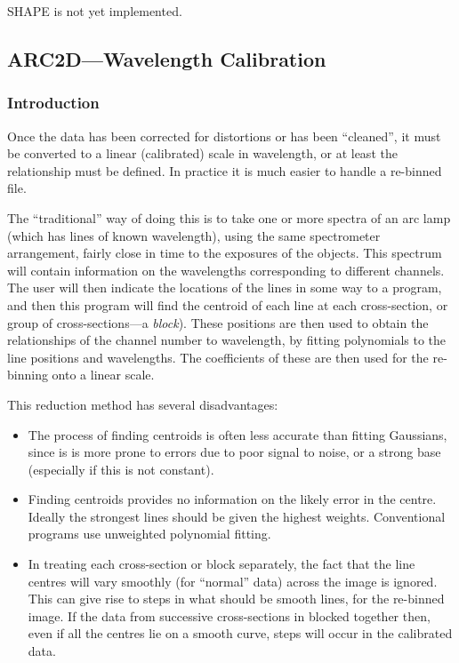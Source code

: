 SHAPE is not yet implemented.

\subsection{\label{arc2dwavelength_calibration}ARC2D---Wavelength Calibration}
\label{sc.arc2d}

\subsubsection{Introduction}

Once the data has been corrected for distortions or has been
``cleaned'', it must be converted to a linear (calibrated) scale in
wavelength, or at least the relationship must be defined.
In practice it is much easier to handle a re-binned file. 

The ``traditional'' way of doing this is to take one or more spectra
of an arc lamp (which has lines of known wavelength), using the same
spectrometer arrangement, fairly close in time to the exposures of the
objects. This spectrum will contain information on the wavelengths
corresponding to different channels. The user will then indicate the
locations of the lines in some way to a program, and then this program
will find the centroid of each line at each cross-section, or group of
cross-sections---a {\em block}). These positions are then used to obtain
the relationships of the channel number to wavelength, by fitting
polynomials to the line positions and wavelengths. The coefficients of
these are then used for the re-binning onto a linear scale.

This reduction method has several disadvantages:
\begin{itemize}
\item The process of finding centroids is often less accurate than
fitting Gaussians, since is is more prone to errors due to poor signal
to noise, or a strong base (especially if this is not constant).
\item Finding centroids provides no information on the likely error
in the centre. Ideally the strongest lines should be given the highest
weights. Conventional programs use unweighted polynomial fitting.
\item In treating each cross-section or block separately, the fact that
the line centres will vary smoothly (for ``normal'' data) across the
image is ignored. This can give rise to steps in what should be smooth
lines, for the re-binned image. If the data from successive
cross-sections in blocked together then, even if all the centres lie on
a smooth curve, steps will occur in the calibrated data.
\end{itemize}

